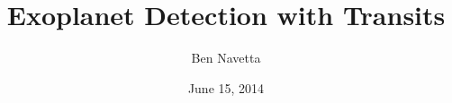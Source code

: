 \usepackage{hyperref}
\usepackage{mathtools}
\usepackage{nth}
\usepackage{siunitx}
\usepackage{wasysym}

\DeclareSIUnit[number-unit-product = \text{ }]
\DeclareSIUnit{}
\DeclareSIUnit[number-unit-product = \text{ }]
\DeclareSIUnit[number-unit-product = \text{ }]

\usepackage[backend=biber, style=phys]{biblatex}


\author{Ben Navetta}
\title{Exoplanet Detection with Transits}
\date{June 15, 2014}

